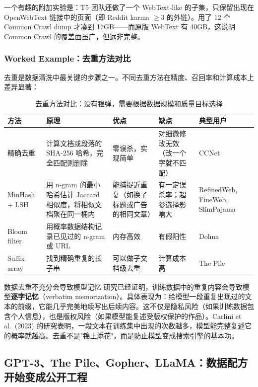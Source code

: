 \documentclass[a4paper]{article}
\begin{document}
一个有趣的附加实验是：T5 团队还做了一个 WebText-like 的子集，只保留出现在 OpenWebText 链接中的页面（即 Reddit karma $\geq 3$ 的外链）。用了 12 个 Common Crawl dump 才凑到 17GB——而原版 WebText 有 40GB，这说明 Common Crawl 的覆盖面虽广，但远非完整。

\subsubsection{Worked Example：去重方法对比}

去重是数据清洗中最关键的步骤之一。不同去重方法在精度、召回率和计算成本上差异显著：

\begin{table}[H]
\centering
\begin{tabular}{p{}p{}p{}p{}p{}}
\toprule
\textbf{方法} & \textbf{原理} & \textbf{优点} & \textbf{缺点} & \textbf{典型用户} \\
\midrule
精确去重 & 计算文档或段落的 SHA-256 哈希，完全匹配则删除 & 零误杀，实现简单 & 对细微修改无效（改一个字就不匹配） & CCNet \\
MinHash + LSH & 用 n-gram 的最小哈希估计 Jaccard 相似度，将相似文档聚在同一桶内 & 能捕捉近重复（如换了标题或广告的相同文章） & 有一定误杀率；超参选择影响大 & RefinedWeb, FineWeb, SlimPajama \\
Bloom filter & 用概率数据结构记录已见过的 n-gram 或 URL & 内存高效 & 有假阳性 & Dolma \\
Suffix array & 找到精确重复的长子串 & 可以做子文档级去重 & 计算成本高 & The Pile \\
\bottomrule
\end{tabular}
\caption{去重方法对比：没有银弹，需要根据数据规模和质量目标选择}
\end{table}

\begin{warningbox}{数据去重不充分会导致模型记忆}
研究已经证明，训练数据中的重复内容会导致模型\textbf{逐字记忆}（verbatim memorization）。具体表现为：给模型一段重复出现过的文本的前缀，它能几乎完美地续写出后续内容。这不仅是隐私风险（如果训练数据包含个人信息），也是版权风险（如果模型能复述受版权保护的作品）。Carlini et al.~(2023) 的研究表明，一段文本在训练集中出现的次数越多，模型能完整复述它的概率就越高。去重不是"锦上添花"，而是防止模型变成搜索引擎的基本功。
\end{warningbox}

\subsection{GPT-3、The Pile、Gopher、LLaMA：数据配方开始变成公开工程}
\end{document}
